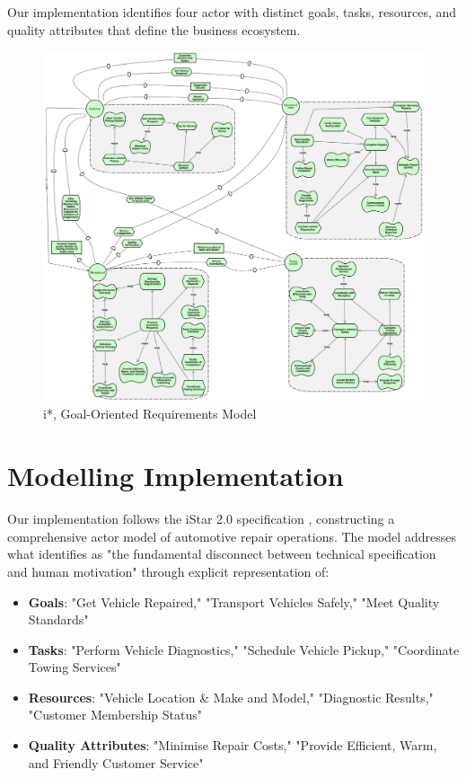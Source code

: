 \documentclass[14pt,a4paper]{article}
\begin{document}
Our implementation identifies four actor with distinct goals, tasks, resources, and quality attributes that define the business ecosystem.

\begin{figure}[ht]
  \hspace{-6.5em}
    \begin{minipage}[t]{1.3\textwidth}
        \includegraphics[width=\linewidth]{istar.png}
        \caption{i*, Goal-Oriented Requirements Model}
    \end{minipage}
\end{figure}

\section{Modelling Implementation}

Our implementation follows the iStar 2.0 specification \parencite[p. 344]{Dalpiaz2016}, constructing a comprehensive actor model of automotive repair operations. The model addresses what \textcite[p. 87]{Sommerville2016} identifies as "the fundamental disconnect between technical specification and human motivation" through explicit representation of:

\begin{itemize}
    \item \textbf{Goals}: "Get Vehicle Repaired," "Transport Vehicles Safely," "Meet Quality Standards"
    \item \textbf{Tasks}: "Perform Vehicle Diagnostics," "Schedule Vehicle Pickup," "Coordinate Towing Services"
    \item \textbf{Resources}: "Vehicle Location \& Make and Model," "Diagnostic Results," "Customer Membership Status"
    \item \textbf{Quality Attributes}: "Minimise Repair Costs," "Provide Efficient, Warm, and Friendly Customer Service"
\end{itemize}
\end{document}
